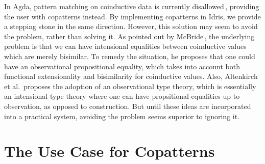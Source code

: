 In Agda, pattern matching on coinductive data is currently
disallowed\,\citep{Danielsson09}, providing the user with copatterns instead. By
implementing copatterns in Idris, we provide a stepping stone in the same
direction. However, this solution may seem to avoid the problem, rather than
solving it. As pointed out by McBride\,\citep{McBride:2009}, the underlying
problem is that we can have intensional equalities between coinductive values
which are merely bisimilar. To remedy the situation, he proposes that one could
have an observational propositional equality, which takes into account both
functional extensionality and bisimilarity for coinductive values. Also,
Altenkirch et al.\,\citep{Altenkirch:2007} proposes the adoption of an
observational type theory, which is essentially an intensional type theory where
one can have propsitional equalities up to observation, as opposed to
construction. But until these ideas are incorporated into a practical system,
avoiding the problem seems superior to ignoring it.


\section{The Use Case for Copatterns}
\label{sec:motivation_copatterns}



